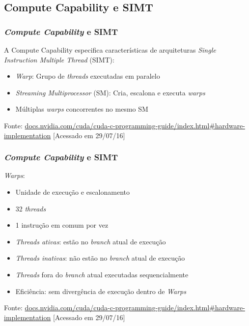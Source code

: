 \documentclass[10pt, compress]{beamer}
\begin{document}
\subsection{Compute Capability e SIMT}

\begin{frame}
    \frametitle{\textit{Compute Capability} e SIMT}
    A \alert{Compute Capability} especifica características de
    arquiteturas \textit{Single Instruction Multiple Thread} (SIMT):
    \pause
    \begin{itemize}
        \item \textit{Warp}: Grupo de \textit{threads} executadas em \alert{paralelo}
        \item \textit{Streaming Multiprocessor} (SM): Cria, escalona e executa \textit{warps}
            \pause
        \item Múltiplas \textit{warps} \alert{concorrentes} no mesmo SM
    \end{itemize}
    \vfill

    \begin{center}
        \tiny{Fonte: \url{docs.nvidia.com/cuda/cuda-c-programming-guide/index.html\#hardware-implementation} [Acessado em 29/07/16]}
    \end{center}
\end{frame}

\begin{frame}
    \frametitle{\textit{Compute Capability} e SIMT}
    \textit{Warps}:
    \pause
    \begin{itemize}
        \item Unidade de execução e escalonamento
        \item 32 \textit{threads}
            \pause
        \item 1 \alert{instrução em comum} por vez
            \pause
        \item \textit{Threads ativas}: estão no \textit{branch} atual de
            execução
        \item \textit{Threads inativas}: \alert{não} estão no \textit{branch}
            atual de execução
            \pause
        \item \textit{Threads} fora do \textit{branch} atual executadas
            \alert{sequencialmente}
            \pause
        \item Eficiência: sem divergência de execução dentro de \textit{Warps}
    \end{itemize}
    \vfill

    \begin{center}
        \tiny{Fonte: \url{docs.nvidia.com/cuda/cuda-c-programming-guide/index.html\#hardware-implementation} [Acessado em 29/07/16]}
    \end{center}
\end{frame}
\end{document}
